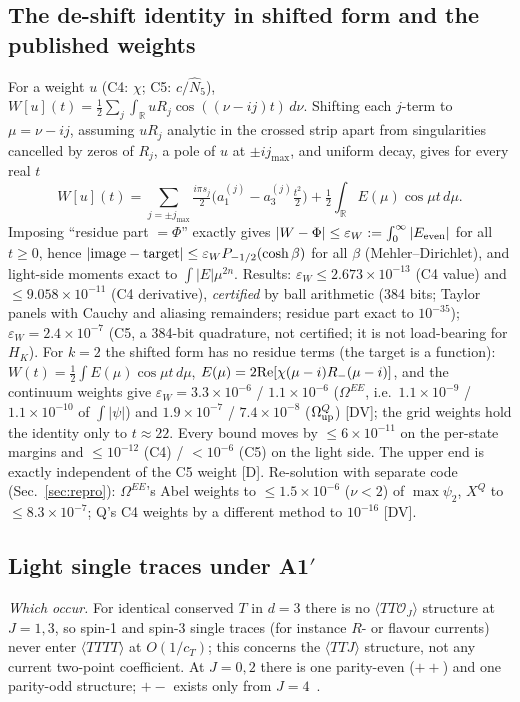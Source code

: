 \documentclass[aps,prl,onecolumn,superscriptaddress,nofootinbib]{revtex4-2}
\begin{document}
\subsection{The de-shift identity in shifted form and the published weights}
\label{sec:deshift}
For a weight $u$ (C4: $\chi$; C5: $c/\hat N_5$),
$W[u](t)=\tfrac12\sum_j\int_{\mathbb R}uR_j\cos((\nu-ij)t)\,d\nu$. Shifting each $j$-term to
$\mu=\nu-ij$, assuming $uR_j$ analytic in the crossed strip apart from singularities cancelled by
zeros of $R_j$, a pole of $u$ at $\pm ij_{\max}$, and uniform decay, gives for every real $t$
\begin{equation}
W[u](t)=\sum_{j=\pm j_{\max}}\tfrac{i\pi s_j}{2}\big(a_1^{(j)}-a_3^{(j)}\tfrac{t^2}{2}\big)+\tfrac12\int_{\mathbb R}E(\mu)\cos\mu t\,d\mu .
\end{equation}
Imposing ``residue part $=\Phi$'' exactly gives $|W-\Phi|\le\varepsilon_W:=\int_0^\infty|E_{\rm even}|$ for
all $t\ge0$, hence $|{\rm image}-{\rm target}|\le\varepsilon_WP_{-1/2}(\cosh\beta)$ for all $\beta$
(Mehler--Dirichlet), and light-side moments exact to $\int|E|\mu^{2n}$. Results: $\varepsilon_W\le2.673\times10^{-13}$
(C4 value) and $\le9.058\times10^{-11}$ (C4 derivative), \emph{certified} by ball arithmetic (384 bits; Taylor
panels with Cauchy and aliasing remainders; residue part exact to $10^{-35}$); $\varepsilon_W=2.4\times10^{-7}$ (C5,
a 384-bit quadrature, not certified; it is not load-bearing for $H_K$). For $k=2$ the shifted form has no residue terms (the target is a function):
$W(t)=\tfrac12\int E(\mu)\cos\mu t\,d\mu$, $E(\mu)=2{\rm Re}[\chi(\mu-i)R_-(\mu-i)]$, and the continuum weights give
$\varepsilon_W=3.3\times10^{-6}$ / $1.1\times10^{-6}$ ($\Omega^{EE}$, i.e.\ $1.1\times10^{-9}$ / $1.1\times10^{-10}$ of
$\int|\psi|$) and $1.9\times10^{-7}$ / $7.4\times10^{-8}$ ($\Omega^Q_{\rm up}$) [DV]; the grid weights hold the identity
only to $t\approx22$. Every bound moves by $\le6\times10^{-11}$ on the per-state margins and $\le10^{-12}$
(C4) / $<10^{-6}$ (C5) on the light side. The upper end is exactly independent of the C5 weight [D].
Re-solution with separate code (Sec.~\ref{sec:repro}): $\Omega^{EE}$'s Abel weights to $\le1.5\times10^{-6}$ ($\nu<2$) of $\max\psi_2$, $X^Q$
to $\le8.3\times10^{-7}$; Q's C4 weights by a different method to $10^{-16}$ [DV].

\subsection{Light single traces under A1\texorpdfstring{$'$}{'}}
\label{sec:light}
\emph{Which occur.} For identical conserved $T$ in $d=3$ there is no $\langle TT\mathcal O_J\rangle$ structure at
$J=1,3$, so spin-1 and spin-3 single traces (for instance $R$- or flavour currents) never enter
$\langle TTTT\rangle$ at $O(1/c_T)$; this concerns the $\langle TTJ\rangle$ structure, not any current
two-point coefficient. At $J=0,2$ there is one parity-even ($++$) and one parity-odd structure; $+-$ exists only
from $J=4$~\cite{CHLPS}.
\end{document}
